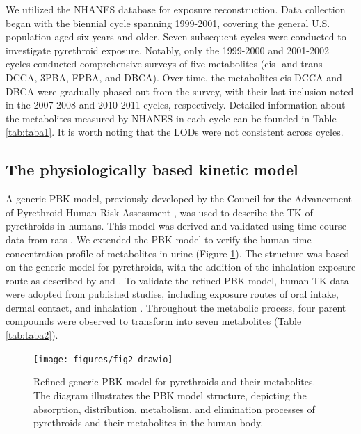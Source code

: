 \documentclass[toxics,article,submit,pdftex,moreauthors]{Definitions/mdpi}
\begin{document}
We utilized the NHANES database for exposure reconstruction. Data
collection began with the biennial cycle spanning 1999-2001, covering
the general U.S. population aged six years and older. Seven subsequent
cycles were conducted to investigate pyrethroid exposure. Notably, only
the 1999-2000 and 2001-2002 cycles conducted comprehensive surveys of
five metabolites (cis- and trans-DCCA, 3PBA, FPBA, and DBCA). Over time,
the metabolites cis-DCCA and DBCA were gradually phased out from the
survey, with their last inclusion noted in the 2007-2008 and 2010-2011
cycles, respectively. Detailed information about the metabolites
measured by NHANES in each cycle can be founded in Table \ref{tab:taba1}.
It is worth noting that the LODs were not consistent across cycles.

\subsection{The physiologically based kinetic
model}\label{the-physiologically-based-kinetic-model}

A generic PBK model, previously developed by the Council for the
Advancement of Pyrethroid Human Risk Assessment
\citep{song2019evaluation, mallick2020development, mallick_physiologically_2020},
was used to describe the TK of pyrethroids in humans. This model was
derived and validated using time-course data from rats
\citep{mirfazaelian_development_2006, tornero2010evaluation}. We
extended the PBK model to verify the human time-concentration profile of
metabolites in urine (Figure \ref{fig:fig2}). The structure was based on
the generic model for pyrethroids, with the addition of the inhalation
exposure route as described by \citet{beaudouin2010stochastic} and
\citet{quindroit2019estimating}. To validate the refined PBK model,
human TK data were adopted from published studies, including exposure
routes of oral intake, dermal contact, and inhalation
\citep{leng1997human, leng1997biological, ratelle2015toxicokinetics, ratelle2015time}.
Throughout the metabolic process, four parent compounds were observed to
transform into seven metabolites (Table \ref{tab:taba2}).

\begin{figure}[H]
\texttt{[image: figures/fig2-drawio]} \caption{Refined generic PBK model for pyrethroids and their metabolites. The diagram illustrates the PBK model structure, depicting the absorption, distribution, metabolism, and elimination processes of pyrethroids and their metabolites in the human body.}\label{fig:fig2}
\end{figure}
\end{document}
